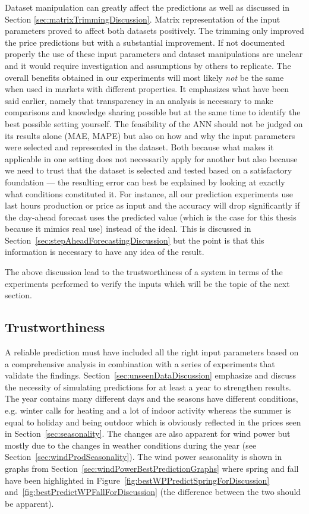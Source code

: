 Dataset manipulation can greatly affect the predictions as well as discussed in Section \ref{sec:matrixTrimmingDiscussion}. Matrix representation of the input parameters proved to affect both datasets positively. The trimming only improved the price predictions but with a substantial improvement. If not documented properly the use of these input parameters and dataset manipulations are unclear and it would require investigation and assumptions by others to replicate. The overall benefits obtained in our experiments will most likely \emph{not} be the same when used in markets with different properties. It emphasizes what have been said earlier, namely that transparency in an analysis is necessary to make comparisons and knowledge sharing possible but at the same time to identify the best possible setting yourself. The feasibility of the ANN should not be judged on its results alone (MAE, MAPE) but also on how and why the input parameters were selected and represented in the dataset. Both because what makes it applicable in one setting does not necessarily apply for another but also because we need to trust that the dataset is selected and tested based on a satisfactory foundation --- the resulting error can best be explained by looking at exactly what conditions constituted it. For instance, all our prediction experiments use last hours production or price as input and the accuracy will drop significantly if the day-ahead forecast uses the predicted value (which is the case for this thesis because it mimics real use) instead of the ideal. This is discussed in Section~\ref{sec:stepAheadForecastingDiscussion} but the point is that this information is necessary to have any idea of the result. 

The above discussion lead to the trustworthiness of a system in terms of the experiments performed to verify the inputs which will be the topic of the next section.  

\subsection{Trustworthiness}
A reliable prediction must have included all the right input parameters based on a comprehensive analysis in combination with a series of experiments that validate the findings. Section~\ref{sec:unseenDataDiscussion} emphasize and discuss the necessity of simulating predictions for at least a year to strengthen results. The year contains many different days and the seasons have different conditions, e.g. winter calls for heating and a lot of indoor activity whereas the summer is equal to holiday and being outdoor which is obviously reflected in the prices seen in Section~\ref{sec:seasonality}. The changes are also apparent for wind power but mostly due to the changes in weather conditions during the year (see Section~\ref{sec:windProdSeasonality}). The wind power seasonality is shown in graphs from Section~\ref{sec:windPowerBestPredictionGraphs} where spring and fall have been highlighted in Figure~\ref{fig:bestWPPredictSpringForDiscussion} and~\ref{fig:bestPredictWPFallForDiscussion} (the difference between the two should be apparent). 

